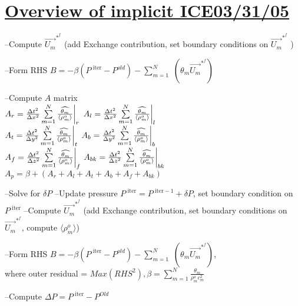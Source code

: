 \documentclass[fleqn]{article}
\newcommand{\SUM}[1]    {\ensuremath{\sum \limits_{{#1}=1}^N }}
\newcommand{\B}[1]      {\biggr{#1}}
\newcommand{\rhoM}      {\ensuremath{\rho^{o}_m}}
\newcommand{\rhoMFC}    {\ensuremath{\langle \rhoM \rangle}}
\newcommand{\delt}      {\ensuremath{\Delta{t}} }
\newcommand{\delx}      {\ensuremath{\Delta{x}} }
\newcommand{\dely}      {\ensuremath{\Delta{y}} }
\newcommand{\delz}      {\ensuremath{\Delta{z}} }
\newcommand{\velFC}     {\ensuremath{\vec{U_m}^{*^{f}} } }
\newcommand{\thetaUW}   {\ensuremath{\widehat{\theta_m}} }
\newcommand{\iter}      {\ensuremath{\text{ iter}}}
\begin{document}
\setlength{\abovedisplayskip}{0.1in}
\setlength{\mathindent}{0.0in}
\section{\underline{Overview of implicit ICE\hspace{ 0.5in}03/31/05}  }

\begin{algorithmic}
\STATE --Compute $ \velFC$ (add Exchange contribution, set boundary
             conditions on $\velFC$ )
             
\STATE --Form RHS $B = -\beta (P^{ \iter} - P^{old}) - \SUM{m}$  $(\theta_m \velFC)$
    

    \STATE --Compute $A$ matrix \\ \quad
      $A_r = \frac{\delt^2}{\delx^2} \SUM{m} \frac{\thetaUW}{\rhoMFC} \B{|}_{r}$ \quad
      $A_l = \frac{\delt^2}{\delx^2} \SUM{m} \frac{\thetaUW}{\rhoMFC} \B{|}_{l}$ \\ \quad
      $A_t = \frac{\delt^2}{\dely^2} \SUM{m} \frac{\thetaUW}{\rhoMFC} \B{|}_{t}$ \quad
      $A_b = \frac{\delt^2}{\dely^2} \SUM{m} \frac{\thetaUW}{\rhoMFC} \B{|}_{b}$ \\ \quad
      $A_f = \frac{\delt^2}{\delz^2} \SUM{m} \frac{\thetaUW}{\rhoMFC} \B{|}_{f}$ \quad
      $A_{bk} = \frac{\delt^2}{\delz^2} \SUM{m} \frac{\thetaUW}{\rhoMFC} \B{|}_{bk}$ \\ \quad
      $A_{p} =\beta +( A_r + A_l + A_t + A_b + A_f + A_ {bk})$
      
    \STATE --Solve for $\delta{P}$
    \STATE --Update pressure $P^{\iter} = P^{\iter -1 } + \delta{P}$, set boundary condition on $P^{\iter}$
    \STATE --Compute $ \velFC$ (add Exchange contribution, set boundary
             conditions on $\velFC$, compute $ \rhoMFC $)
             
    \STATE --Form RHS $B = -\beta (P^{ \iter} - P^{old}) - \SUM{m}$  $(\theta_m \velFC)$,\\ \quad
             where outer residual = $Max(RHS^2), \beta = \SUM{m} \frac{\theta_m}{\rhoM c_m^2}$
    
\ENDWHILE

\STATE --Compute $\Delta{P} = P^{\iter} - P^{Old}$
\end{algorithmic}
\newpage
\end{document}
